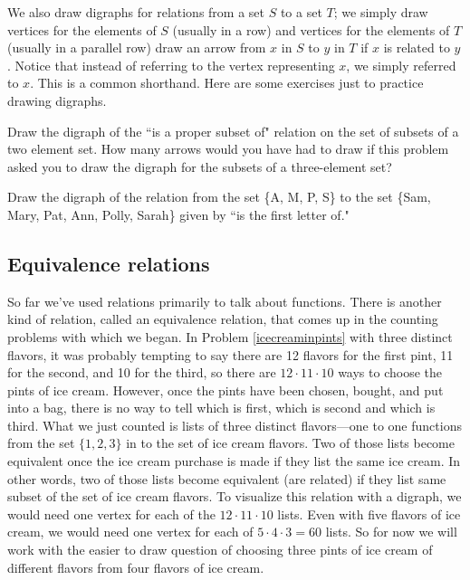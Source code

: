 We also draw digraphs for relations from a set $S$ to a  set
$T$; we simply draw vertices for the elements of $S$ (usually
in a row) and vertices for the elements of $T$ (usually in a
parallel row) draw an arrow from
$x$ in $S$ to $y$ in $T$ if $x$ is related to $y$.  Notice
that instead of referring to the vertex representing $x$, we
simply referred to $x$.  This is a common shorthand.  Here are
some exercises just to practice drawing digraphs.

\bp
\item Draw the digraph of the ``is a proper subset of" relation
on the set of subsets of a two element set.  How many arrows
would you have had to draw if this problem asked you to draw
the digraph for the subsets of a three-element set?

\item Draw the digraph of the relation from the set \{A, M, P,
S\} to the set \{Sam, Mary, Pat, Ann, Polly, Sarah\}  given by
``is the first letter of."
\solution{\begin{center}
\mbox{\psfig{figure=initialdigraph.eps%
}}
\end{center} }
\ep

\subsection{Equivalence relations}\label{equivalencerelations} So
far we've used relations primarily to talk about functions. 
There is another kind of relation, called an equivalence
relation, that comes up in the counting problems with which we
began.
 In Problem
\ref{icecreaminpints} with three distinct flavors, it was
probably tempting to say there are 12 flavors for the first
pint, 11 for the second, and 10 for the third, so there are
$12\cdot 11\cdot 10$ ways to choose the pints of ice cream. 
However, once the pints have been chosen, bought, and put into a
bag, there is no way to tell which is first, which is second and
which is third.  What we just counted is lists of three
distinct flavors---one to one functions from the set
$\{1,2,3\}$ in to the set of ice cream flavors.  Two of those
lists become equivalent once the ice cream purchase is
made if they list the same ice cream.  In other words, two of
those lists become equivalent (are related) if they list same
subset of the set of ice cream flavors.  To visualize this
relation with a digraph, we would need one vertex for each of
the 
$12\cdot 11\cdot 10$ lists.  Even with
 five flavors of ice cream, we would need one vertex for each
of
$5\cdot4\cdot3=60$ lists.  So for now we will work with the easier
to draw question of choosing three pints of ice cream of different
flavors from four flavors of ice cream.


